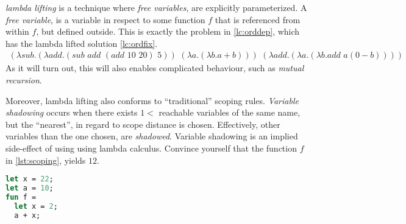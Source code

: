 \documentclass[11pt,oneside,a4paper]{report}
\begin{document}
\textit{lambda lifting} is a technique where \textit{free variables}, are explicitly parameterized.
A \textit{free variable}, is a variable in respect to some function $f$ that is referenced from within $f$, but defined outside. 
This is exactly the problem in \autoref{lc:orddep}, which has the lambda lifted solution \autoref{lc:ordfix}.
\begin{align}
(\lambda sub . (\lambda add . (sub \,\, add \,\, (add \,\, 10 \,\, 20) \,\, 5)) \,\, (\lambda a . (\lambda b . a + b))) \,\, (\lambda add .(\lambda a . (\lambda b . add \,\, a (0 - b))))
\label{lc:ordfix}
\end{align}
As it will turn out, this will also enables complicated behaviour, such as \textit{mutual recursion}.

Moreover, lambda lifting also conforms to ``traditional'' scoping rules.
\textit{Variable shadowing} occurs when there exists $1 < $ reachable variables of the same name, but the ``nearest'', in regard to scope distance is chosen.
Effectively, other variables than the one chosen, are \textit{shadowed}.
Variable shadowing is an implied side-effect of using using lambda calculus.
Convince yourself that the function $f$ in \autoref{lst:scoping}, yields $12$.
\begin{lstlisting}[language=ML,caption={Scoping rules in programming languages},label={lst:scoping},xleftmargin=.32\textwidth]
let x = 22;
let a = 10;
fun f = 
  let x = 2;
  a + x;
\end{lstlisting}
\end{document}
